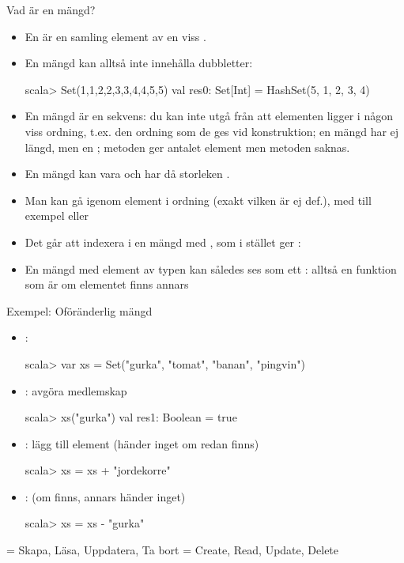 

\begin{Slide}{Vad är en mängd?}\SlideFontSmall
\begin{itemize}
\item En  är en samling  element av en viss .
\item En mängd kan alltså inte innehålla dubbletter:
\begin{REPLnonum}
scala> Set(1,1,2,2,3,3,4,4,5,5)
val res0: Set[Int] = HashSet(5, 1, 2, 3, 4)
\end{REPLnonum}
\pause
\item En mängd är   en sekvens: du kan inte utgå från att elementen ligger i någon viss ordning, t.ex. den ordning som de ges vid konstruktion; en mängd har ej längd, men en ; metoden  ger antalet element men metoden  saknas.
\item En mängd kan vara  och har då storleken .
\pause
\item Man kan gå igenom element i  ordning (exakt vilken är ej def.), med till exempel  eller 
\pause
\item Det går  att indexera i en mängd med , som i stället ger : 
\item En mängd  med element av typen  kan således ses som ett : alltså en funktion  som är  om elementet finns annars 
\end{itemize}
\end{Slide}


\begin{Slide}{Exempel: Oföränderlig mängd}
\setlength{\leftmargini}{1em}
\begin{itemize}
\item {}:
\begin{REPLnonum}
scala> var xs = Set("gurka", "tomat", "banan", "pingvin")
\end{REPLnonum}

\item {}: avgöra medlemskap
\begin{REPLnonum}
scala> xs("gurka")
val res1: Boolean = true
\end{REPLnonum}

\item {}: lägg till element (händer inget om redan finns)
\begin{REPLnonum}
scala> xs = xs + "jordekorre"
\end{REPLnonum}

\item {}: (om finns, annars händer inget)
\begin{REPLnonum}
scala> xs = xs - "gurka"
\end{REPLnonum}
\end{itemize}
{\SlideFontTiny{} = Skapa, Läsa, Uppdatera, Ta bort \hfill{} = Create, Read, Update, Delete}
\end{Slide}


